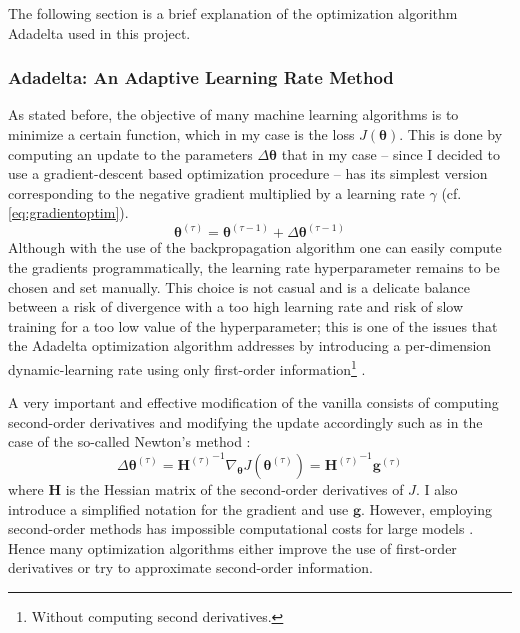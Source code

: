 The following section is a brief explanation of the optimization algorithm Adadelta \citep{Zeiler2012ADADELTA:Method} used in this project.

\subsubsection{Adadelta: An Adaptive Learning Rate Method}

As stated before, the objective of many machine learning algorithms is to minimize a certain function, which in my case is the loss $J(\bm{\theta})$. This is done by computing an update to the parameters $\Delta\bm{\theta}$ that in my case -- since I decided to use a gradient-descent based optimization procedure -- has its simplest version corresponding to the negative gradient multiplied by a learning rate $\gamma$ (cf. \cref{eq:gradientoptim}). 
\begin{equation}
    \bm{\theta}^{(\tau)} = \bm{\theta}^{(\tau-1)} + \Delta \bm{\theta}^{(\tau-1)}
\end{equation}
Although with the use of the backpropagation algorithm one can easily compute the gradients programmatically, the learning rate hyperparameter remains to be chosen and set manually. This choice is not casual and is a delicate balance between a risk of divergence with a too high learning rate and risk of slow training for a too low value of the hyperparameter; this is one of the issues that the Adadelta optimization algorithm addresses by introducing a per-dimension dynamic-learning rate using only first-order information\footnote{Without computing second derivatives.} \citep{Zeiler2012ADADELTA:Method}.

A very important and effective modification of the vanilla consists of computing second-order derivatives and modifying the update accordingly \citep{Goodfellow2016} such as in the case of the so-called Newton's method \citep{Nocedal2006NumericalOptimization}:
\begin{equation} \label{eq:newtonmethod}
    \Delta \bm{\theta}^{(\tau)} = {\bm{H}^{(\tau)}}^{-1} \nabla_{\bm{\theta}} J(\bm{\theta}^{(\tau)}) = {\bm{H}^{(\tau)}}^{-1} \bm{g}^{(\tau)}
\end{equation}
where $\bm{H}$ is the Hessian matrix of the second-order derivatives of $J$. I also introduce a simplified notation for the gradient and use $\bm{g}$. However, employing second-order methods has impossible computational costs for large models \citep{Goodfellow2016}. Hence many optimization algorithms either improve the use of first-order derivatives or try to approximate second-order information.

